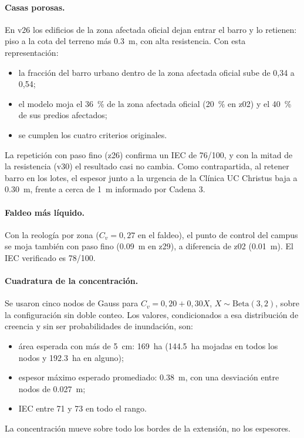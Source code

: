 \paragraph{Casas porosas.} En v26 los edificios de la zona afectada oficial dejan entrar el barro y lo retienen: piso a la cota del terreno más \SI{0,3}{m}, con alta resistencia. Con esta representación:
\begin{itemize}
\item la fracción del barro urbano dentro de la zona afectada oficial sube de 0,34 a 0,54;
\item el modelo moja el \SI{36}{\percent} de la zona afectada oficial (\SI{20}{\percent} en z02) y el \SI{40}{\percent} de sus predios afectados;
\item se cumplen los cuatro criterios originales.
\end{itemize}
La repetición con paso fino (z26) confirma un IEC de 76/100, y con la mitad de la resistencia (v30) el resultado casi no cambia. Como contrapartida, al retener barro en los lotes, el espesor junto a la urgencia de la Clínica UC Christus baja a \SI{0,30}{m}, frente a cerca de \SI{1}{m} informado por Cadena 3.

\paragraph{Faldeo más líquido.} Con la reología por zona ($C_v=0{,}27$ en el faldeo), el punto de control del campus se moja también con paso fino (\SI{0,09}{m} en z29), a diferencia de z02 (\SI{0,01}{m}). El IEC verificado es 78/100.

\paragraph{Cuadratura de la concentración.} Se usaron cinco nodos de Gauss para $C_v=0{,}20+0{,}30X$, $X\sim\mathrm{Beta}(3,2)$, sobre la configuración sin doble conteo. Los valores, condicionados a esa distribución de creencia y sin ser probabilidades de inundación, son:
\begin{itemize}
\item área esperada con más de \SI{5}{cm}: \SI{169}{ha} (\SI{144,5}{ha} mojadas en todos los nodos y \SI{192,3}{ha} en alguno);
\item espesor máximo esperado promediado: \SI{0,38}{m}, con una desviación entre nodos de \SI{0,027}{m};
\item IEC entre 71 y 73 en todo el rango.
\end{itemize}
La concentración mueve sobre todo los bordes de la extensión, no los espesores.

